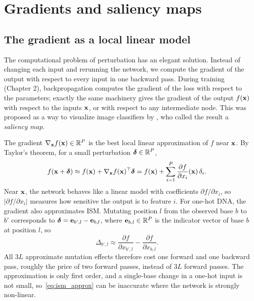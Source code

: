 \section{Gradients and saliency maps}
\label{sec:gradients}

\subsection{The gradient as a local linear model}

The computational problem of perturbation has an elegant solution. Instead of changing each input and rerunning the network, we compute the gradient of the output with respect to every input in one backward pass. During training (Chapter 2), backpropagation computes the gradient of the loss with respect to the parameters; exactly the same machinery gives the gradient of the output $f(\mathbf{x})$ with respect to the inputs $\mathbf{x}$, or with respect to any intermediate node. This was proposed as a way to visualize image classifiers by \citet{simonyan2014}, who called the result a \emph{saliency map}.

The gradient $\nabla_{\mathbf{x}}f(\mathbf{x})\in\mathbb{R}^P$ is the best local linear approximation of $f$ near $\mathbf{x}$. By Taylor's theorem, for a small perturbation $\boldsymbol{\delta}\in\mathbb{R}^P$,
\begin{equation}
  f(\mathbf{x}+\boldsymbol{\delta}) \approx f(\mathbf{x}) + \nabla_{\mathbf{x}}f(\mathbf{x})^\top\boldsymbol{\delta} = f(\mathbf{x}) + \sum_{i=1}^P \frac{\partial f}{\partial x_i}(\mathbf{x})\,\delta_i .
  \label{eq:taylor}
\end{equation}
Near $\mathbf{x}$, the network behaves like a linear model with coefficients $\partial f/\partial x_i$, so $|\partial f/\partial x_i|$ measures how sensitive the output is to feature $i$. For one-hot DNA, the gradient also approximates ISM. Mutating position $l$ from the observed base $b$ to $b'$ corresponds to $\boldsymbol{\delta}=\mathbf{e}_{b',l}-\mathbf{e}_{b,l}$, where $\mathbf{e}_{b,l}\in\mathbb{R}^P$ is the indicator vector of base $b$ at position $l$, so
\begin{equation}
  \Delta_{b',l} \approx \frac{\partial f}{\partial x_{b',l}} - \frac{\partial f}{\partial x_{b,l}} .
  \label{eq:ism_approx}
\end{equation}
All $3L$ approximate mutation effects therefore cost one forward and one backward pass, roughly the price of two forward passes, instead of $3L$ forward passes. The approximation is only first order, and a single-base change in a one-hot input is not small, so~\eqref{eq:ism_approx} can be inaccurate where the network is strongly non-linear.

